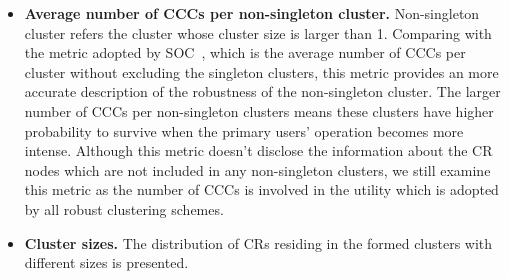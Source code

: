 \documentclass[10pt,journal,compsoc]{IEEEtran}
\theoremstyle{mytheoremstyle}
\theoremstyle{mytheoremstyle}
\theoremstyle{mytheoremstyle}
\newcommand{\ie}{i.e., }
\begin{document}
\begin{itemize}
\item \textbf{Average number of CCCs per non-singleton cluster.}
Non-singleton cluster refers the cluster whose cluster size is larger than 1.
Comparing with the metric adopted by SOC~\cite{LIU_TMC11_2}, which is the average number of CCCs per cluster without excluding the singleton clusters, this metric provides an more accurate description of the robustness of the non-singleton cluster.
The larger number of CCCs per non-singleton clusters means these clusters have higher probability to survive when the primary users' operation becomes more intense.
Although this metric doesn't disclose the information about the CR nodes which are not included in any non-singleton clusters, we still examine this metric as the number of CCCs is involved in the utility which is adopted by all robust clustering schemes.



\item \textbf{Cluster sizes.}
The distribution of CRs residing in the formed clusters with different sizes is presented.



\end{itemize}
\end{document}
